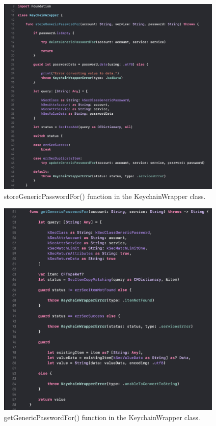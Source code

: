 \begin{figure}[H]
    \centering
    \includegraphics[width=\textwidth]{./graphics/Implementation/Settings/keychain1.png}
    \caption{storeGenericPasswordFor() function in the KeychainWrapper class.}
    \label{fig:keychain1}
\end{figure}

\begin{figure}[H]
    \centering
    \includegraphics[width=\textwidth]{./graphics/Implementation/Settings/keychain2.png}
    \caption{getGenericPasswordFor() function in the KeychainWrapper class.}
    \label{fig:keychain2}
\end{figure}

